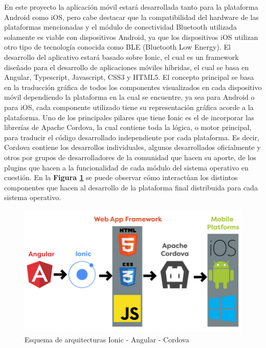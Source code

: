\documentclass{IEEEtran}
\begin{document}
			En este proyecto la aplicación móvil estará desarrollada tanto para la plataforma Android como iOS, pero cabe destacar que la compatibilidad del hardware de las plataformas mencionadas y el módulo de conectividad Bluetooth utilizada solamente es viable con dispositivos Android, ya que los dispositivos iOS utilizan otro tipo de tecnología conocida como BLE (Bluetooth Low Energy).
			El desarrollo del aplicativo estará basado sobre Ionic, el cual es un framework diseñado para el desarrollo de aplicaciones móviles híbridas, el cual se basa en Angular, Typescript, Javascript, CSS3 y HTML5. El concepto principal se basa en la traducción gráfica de todos los componentes visualizados en cada dispositivo móvil dependiendo la plataforma en la cual se encuentre, ya sea para Android o para iOS, cada componente utilizado tiene su representación gráfica acorde a la plataforma.
			Uno de los principales pilares que tiene Ionic es el de incorporar las librerías de Apache Cordova, la cual contiene toda la lógica, o motor principal, para traducir el código desarrollado independiente por cada plataforma. Es decir, Cordova contiene los desarrollos individuales, algunos desarrollados oficialmente y otros por grupos de desarrolladores de la comunidad que hacen su aporte, de los plugins que hacen a la funcionalidad de cada módulo del sistema operativo en cuestión. En la \textbf{Figura \ref{ionic-angular-cordova}} se puede observar cómo interactúan los distintos componentes que hacen al desarrollo de la plataforma final distribuida para cada sistema operativo.


			\begin{figure}
				\centering
				\includegraphics[width=1\linewidth]{ionic-angular-cordova}
				\caption{Esquema de arquitecturas Ionic - Angular - Cordova}
				\label{ionic-angular-cordova}
			\end{figure}
\end{document}
